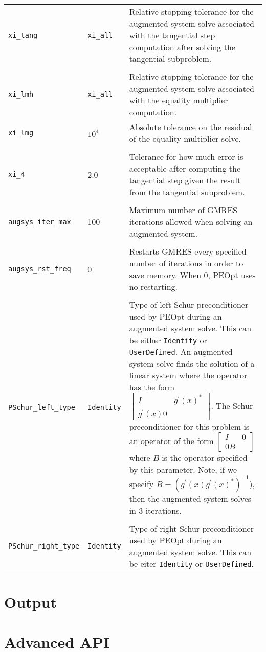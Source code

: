 \documentclass{report}
\begin{document}
\begin{longtable}{llp{}}
\\
\texttt{xi\_tang} & \texttt{xi\_all} & Relative stopping tolerance for the augmented system solve associated with the tangential step computation after solving the tangential subproblem. \\
\\
\texttt{xi\_lmh} & \texttt{xi\_all} & Relative stopping tolerance for the augmented system solve associated with the equality multiplier computation.
\\
\texttt{xi\_lmg} & $10^4$ & Absolute tolerance on the residual of the equality multiplier solve. \\
\\
\texttt{xi\_4} & 2.0 & Tolerance for how much error is acceptable after computing the tangential step given the result from the tangential subproblem.\\
\\
\texttt{augsys\_iter\_max} & 100 & Maximum number of GMRES iterations allowed when solving an augmented system.\\
\\
\texttt{augsys\_rst\_freq} & 0 & Restarts GMRES every specified number of iterations in order to save memory.  When 0, PEOpt uses no restarting.\\
\\
\texttt{PSchur\_left\_type} & \texttt{Identity} & Type of left Schur preconditioner used by PEOpt during an augmented system solve.  This can be either \texttt{Identity} or \texttt{UserDefined}.  An augmented system solve finds the solution of a linear system where the operator has the form $\begin{bmatrix} I & g^\prime(x)^*\\g^\prime(x) 0\end{bmatrix}$.  The Schur preconditioner for this problem is an operator of the form $\begin{bmatrix} I & 0\\ 0 B\end{bmatrix}$ where $B$ is the operator specified by this parameter.  Note, if we specify $B=(g^\prime(x)g^\prime(x)^*)^{-1})$, then the augmented system solves in 3 iterations.\\
\\
\texttt{PSchur\_right\_type} & \texttt{Identity} & Type of right Schur preconditioner used by PEOpt during an augmented system solve.  This can be eiter \texttt{Identity} or \texttt{UserDefined}.
\end{longtable}

\chapter{Output}\label{ch:Output}
\chapter{Advanced API}\label{ch:Advanced}
\end{document}
